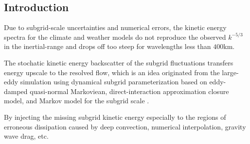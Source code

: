 \documentclass[12pt]{article}
\begin{document}
\subsection{Introduction}
Due to subgrid-scale uncertainties and numerical errors, the kinetic energy spectra for the climate and weather models do not reproduce the observed $k^{-5/3}$ in the inertial-range {\cite{Nastrom85}} and drops off too steep for wavelengths less than $400$km. 


The stochatic kinetic energy backscatter of the subgrid fluctuations transfers energy upscale to the resolved flow, which is an idea originated from the large-eddy simulation using dynamical subgrid parameterization based on eddy-damped quasi-normal Markoviean, direct-interaction approximation closure model, and Markov model for the subgrid scale {\cite{Frederiksen97, Frederiksen06}}.

By injecting the missing subgrid kinetic energy especially to the regions of erroneous dissipation caused by deep convection, numerical interpolation, gravity wave drag, etc.
\end{document}
